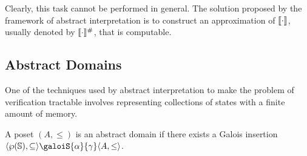 \documentclass[
  10pt,       %
  twoside,    %
  a4paper,    %
  english,    %
  tikz,       %
  openright,  %
]{book}
\begin{document}
Clearly, this task cannot be performed in general. The solution proposed by the
framework of abstract interpretation is to construct an approximation of
$\llbracket \cdot \rrbracket$, usually denoted by $\llbracket \cdot \rrbracket^\#$, that is computable.

\subsection{Abstract Domains}

One of the techniques used by abstract interpretation to make the problem of 
verification tractable involves representing collections of states with a finite 
amount of memory.

\begin{definition}
  A poset $(A, \leq)$ is an abstract domain if there exists a Galois insertion
  $\langle \pow{\states}, \subseteq \rangle \galoiS{\alpha}{\gamma} \langle A, 
  \leq \rangle$.
\end{definition}
\end{document}
